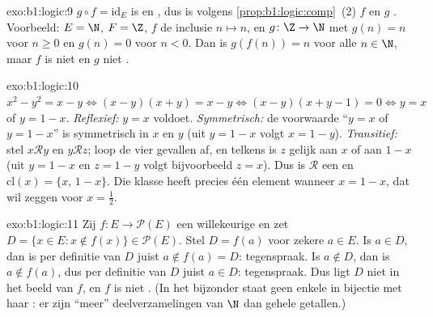 \begin{solution}{exo:b1:logic:9}
$g \circ f = \mathrm{id}_E$ is  en , dus is volgens
\cref{prop:b1:logic:comp}~(2) $f$  en $g$ . Voorbeeld:
$E = \N$, $F = \Z$, $f$ de inclusie $n \mapsto n$, en $g \colon \Z \to
\N$ met $g(n) = n$ voor $n \geq 0$ en $g(n) = 0$ voor $n < 0$. Dan is
$g(f(n)) = n$ voor alle $n \in \N$, maar $f$ is niet  en $g$
niet .
\end{solution}

\begin{solution}{exo:b1:logic:10}
$x^2 - y^2 = x - y \iff (x - y)(x + y) = x - y \iff (x - y)(x + y - 1)
= 0 \iff y = x$ of $y = 1 - x$. \emph{Reflexief:} $y = x$ voldoet.
\emph{Symmetrisch:} de voorwaarde ``$y = x$ of $y = 1 - x$'' is
symmetrisch in $x$ en $y$ (uit $y = 1 - x$ volgt $x = 1 - y$).
\emph{Transitief:} stel $x \mathbin{\mathcal{R}} y$ en $y
\mathbin{\mathcal{R}} z$; loop de vier gevallen af, en telkens is $z$
gelijk aan $x$ of aan $1 - x$ (uit $y = 1 - x$ en $z = 1 - y$ volgt
bijvoorbeeld $z = x$). Dus is $\mathcal{R}$ een  en
$\mathrm{cl}(x) = \{x,\, 1 - x\}$. Die klasse heeft precies één element
wanneer $x = 1 - x$, dat wil zeggen voor $x = \frac12$.
\end{solution}

\begin{solution}{exo:b1:logic:11}
Zij $f \colon E \to \mathcal{P}(E)$ een willekeurige  en zet
$D = \{x \in E : x \notin f(x)\} \in \mathcal{P}(E)$. Stel $D = f(a)$
voor zekere $a \in E$. Is $a \in D$, dan is per definitie van $D$ juist
$a \notin f(a) = D$: tegenspraak. Is $a \notin D$, dan is $a \notin
f(a)$, dus per definitie van $D$ juist $a \in D$: tegenspraak. Dus ligt
$D$ niet in het beeld van $f$, en $f$ is niet . (In het
bijzonder staat geen enkele  in bijectie met haar
: er zijn ``meer'' deelverzamelingen van $\N$ dan gehele
getallen.)
\end{solution}


